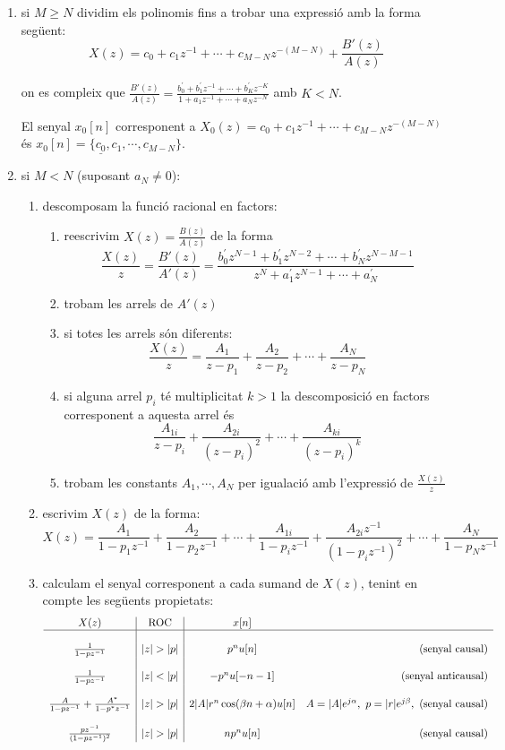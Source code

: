 \documentclass{article}
\begin{document}
\begin{enumerate}
\item si $M \geq N$ dividim els polinomis fins a trobar una expressi\'o amb la forma seg\"uent:
\[
X(z)=c_0+c_1z^{-1}+\cdots+c_{M-N} z^{-(M-N)}+\frac{B'(z)}{A(z)}
\]

on es compleix que $\frac{B'(z)}{A(z)}=\frac{b^{'}_0+b^{'}_1z^{-1}+\cdots+b^{'}_Kz^{-K}}{1+a_1z^{-1}+\cdots+a_Nz^{-N}}$
amb $K < N$.

El senyal $x_0[n]$ corresponent a $X_0(z)= c_0+c_1z^{-1}+\cdots+c_{M-N} z^{-(M-N)}$ \'es 
$x_0[n]=\{\underline{c_0}, c_1, \cdots, c_{M-N}\}$.

\item si $M < N$ (suposant $a_N \neq 0$):
\begin{enumerate}
\item descomposam la funci\'o racional en factors:
\begin{enumerate}
\item reescrivim $X(z)=\frac{B(z)}{A(z)}$ de la forma 
\[
\frac{X(z)}{z}=\frac{B'(z)}{A'(z)}=\frac{b^{'}_0 z^{N-1} + b^{'}_1 z^{N-2} + \cdots + b^{'}_N z^{N-M-1}}{z^N+a^{'}_1 z^{N-1} + \cdots + a^{'}_N}
\]
\item trobam les arrels de $A'(z)$
\item si totes les arrels s\'on diferents: 
\[
\frac{X(z)}{z}= \frac{A_1}{z-p_1} + \frac{A_2}{z-p_2} + \cdots + \frac{A_N}{z-p_N}
\]
\item si alguna arrel $p_i$ t\'e multiplicitat $k > 1$ la descomposici\'o en factors corresponent a
aquesta arrel \'es
\[
\frac{A_{1i}}{z-p_i} + \frac{A_{2i}}{(z-p_i)^2} + \cdots + \frac{A_{ki}}{(z-p_i)^k}
\]
\item trobam les constants $A_1, \cdots, A_N$ per igualaci\'o amb l'expressi\'o de $\frac{X(z)}{z}$
\end{enumerate}
\item escrivim $X(z)$ de la forma:
\[
X(z)= \frac{A_1}{1-p_1z^{-1}} + \frac{A_2}{1-p_2z^{-1}} + \cdots + \frac{A_{1i}}{1-p_i z^{-1}} + \frac{A_{2i} z^{-1}}{(1-p_i z^{-1})^2} + 
\cdots + \frac{A_N}{1-p_Nz^{-1}}
\]
\item calculam el senyal corresponent a cada sumand de $X(z)$, tenint en compte les seg\"uents propietats:
\[
\begin{array}{c|c|cr}
X(z) & \text{ROC} & x[n] & \\ \hline & & & \\
\frac{1}{1-pz^{-1}} & |z|>|p| & p^n u[n] & \text{(senyal causal)} \\ & & & \\
\frac{1}{1-pz^{-1}} & |z|<|p| & -p^n u[-n-1] & \text{(senyal anticausal)} \\ & & & \\
\frac{A}{1-pz^{-1}}  + \frac{A^*}{1-p^*z^{-1}} & |z|>|p| & 2 |A| r^n \cos(\beta n + \alpha) u[n] & 
A=|A|e^{j\alpha}, \,\, p=|r|e^{j\beta}, \,\, \text{(senyal causal)} \\ & & & \\
\frac{pz^{-1}}{(1-pz^{-1})^2} & |z|>|p| & np^nu[n] & \text{(senyal causal)}
\end{array}
\]


\end{enumerate}
\end{enumerate}
\end{document}
